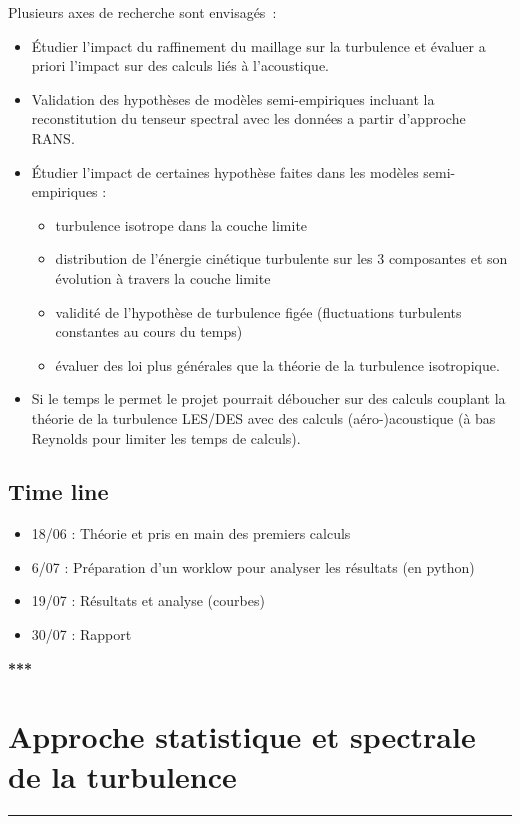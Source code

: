 \documentclass[12pt]{article}
\theoremstyle{plain}
\theoremstyle{remark}
\begin{document}
	Plusieurs axes de recherche sont envisagés~: 
	\begin{itemize}
		\item Étudier l'impact du raffinement du maillage sur la turbulence et évaluer a priori l'impact sur des calculs liés à l'acoustique.
		\item Validation des hypothèses de modèles semi-empiriques incluant la reconstitution du tenseur spectral avec les données a partir d'approche RANS.
		\item Étudier l'impact de certaines hypothèse faites dans les modèles semi-empiriques : 
		\begin{itemize}
			\item turbulence isotrope dans la couche limite
			\item distribution de l'énergie cinétique turbulente sur les 3 composantes et son évolution à travers la couche limite
			\item validité de l'hypothèse de turbulence figée (fluctuations turbulents constantes au cours du temps)
			\item évaluer des loi plus générales que la théorie de la turbulence isotropique.
		\end{itemize}
	\item Si le temps le permet le projet pourrait déboucher sur des calculs couplant la théorie de la turbulence LES/DES avec des calculs (aéro-)acoustique (à bas Reynolds pour limiter les temps de calculs).
	\end{itemize}

	\subsection{Time line} 
	
	\begin{itemize}
		\item 18/06 : Théorie et pris en main des premiers calculs
		\item 6/07 : Préparation d'un worklow pour analyser les résultats (en python)
		\item 19/07 : Résultats et analyse (courbes)
		\item 30/07 : Rapport
	\end{itemize}

\begin{center}
	\large {\bf{***}}
\end{center}

\vspace{0.4cm}
\section{Approche statistique et spectrale de la turbulence}
\noindent\rule{\linewidth}{1pt}
\vspace{0.3cm}
\end{document}
